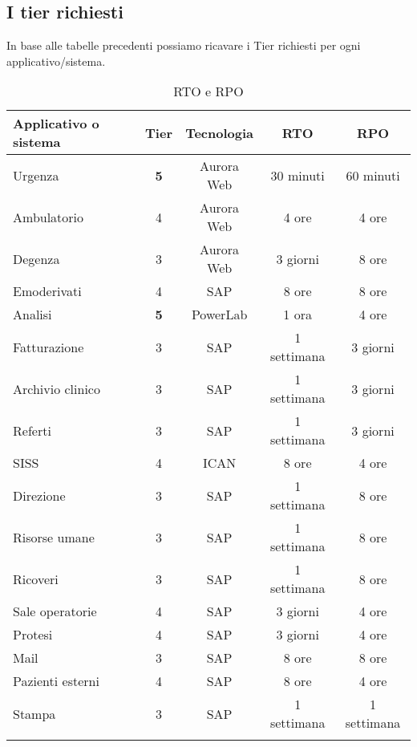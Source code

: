 \subsection{I tier richiesti}
In base alle tabelle precedenti possiamo ricavare i Tier richiesti per ogni applicativo/sistema.
\renewcommand\arraystretch{1,5}
\begin{longtable}{p{4cm} c c c c }
\toprule
\textbf{Applicativo o sistema} & \textbf{Tier} & \textbf{Tecnologia} & \textbf{RTO} & \textbf{RPO} \\
\toprule
	Urgenza 		& \textbf{5} & Aurora Web & 30 minuti & 60 minuti \\
    Ambulatorio		& 4 & Aurora Web &4 ore & 4 ore  \\
	Degenza 		& 3 & Aurora Web & 3 giorni & 8 ore \\
	Emoderivati 	& 4 & SAP & 8 ore & 8 ore \\
    Analisi 		& \textbf{5} & PowerLab & 1 ora & 4 ore \\
    Fatturazione 	& 3 & SAP & 1 settimana & 3 giorni \\
    Archivio clinico & 3 & SAP & 1 settimana & 3 giorni \\
    Referti 		& 3 & SAP & 1 settimana & 3 giorni \\
    SISS 			& 4 & ICAN & 8 ore & 4 ore \\
    Direzione 		& 3 & SAP & 1 settimana & 8 ore \\
    Risorse umane 	& 3 & SAP & 1 settimana & 8 ore \\
    Ricoveri 		& 3 & SAP & 1 settimana & 8 ore \\
    Sale operatorie & 4 & SAP & 3 giorni & 4 ore \\
    Protesi 		& 4 & SAP & 3 giorni & 4 ore \\
    Mail 			& 3 & SAP & 8 ore & 8 ore \\
    Pazienti esterni & 4 & SAP & 8 ore & 4 ore \\
    Stampa 			& 3 & SAP & 1 settimana &  1 settimana \\
\bottomrule
\caption{RTO e RPO }
\end{longtable}

